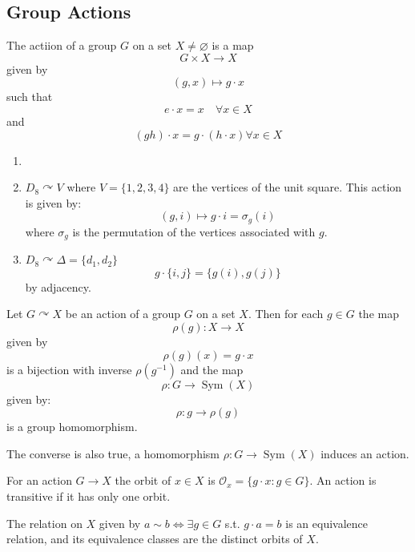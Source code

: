 \documentclass[12pt]{article}
\begin{document}
\subsection{Group Actions}
\begin{definition}
    The actiion of a group $G$ on a set $X \neq \varnothing$ is a map
    \[ G \times X \to X \]
    given by
    \[ (g, x) \mapsto g \cdot x \]
    such that 
    \[ e \cdot x = x \quad \forall x \in X \]
    and
    \[ (gh) \cdot x = g \cdot (h \cdot x) \forall x \in X \]
\end{definition}
\begin{example}
    \begin{enumerate}
        \item[]
        \item[(1)]
        $D_8 \curvearrowright V$ where $V = \{ 1, 2, 3, 4 \}$ are the vertices of the unit square.
        This action is given by:
        \[ (g, i) \mapsto g \cdot i = \sigma_g(i) \]
        where $\sigma_g$ is the permutation of the vertices associated with $g$.

        \item[(2)]
        $D_8 \curvearrowright \Delta = \{ d_1, d_2 \}$
        \[ g \cdot \{i, j\} = \{ g(i), g(j) \} \]
        by adjacency.
    \end{enumerate}
\end{example}
\begin{theorem}
    Let $G \curvearrowright X$ be an action of a group $G$ on a set $X$.
    Then for each $g \in G$ the map
    \[ \rho(g): X \to X \]
    given by
    \[ \rho(g)(x) = g \cdot x \]
    is a bijection with inverse $\rho(g^{-1})$ and the map
    \[ \rho: G \to \operatorname{Sym}(X) \]
    given by:
    \[ \rho: g \to \rho(g) \]
    is a group homomorphism.
\end{theorem}
\begin{remark}
    The converse is also true, a homomorphism $\rho: G \to \operatorname{Sym}(X)$
    induces an action.
\end{remark}
\begin{definition}
    For an action $G \to X$ the orbit of $x \in X$ is $\mathcal O_x = \{ g \cdot x : g \in G \}$.
    An action is transitive if it has only one orbit.
\end{definition}
\begin{proposition}
    The relation on $X$ given by $a \sim b \iff \exists g \in G$ s.t. $g \cdot a = b$
    is an equivalence relation, and its equivalence classes are the distinct orbits of $X$.
\end{proposition}
\end{document}
